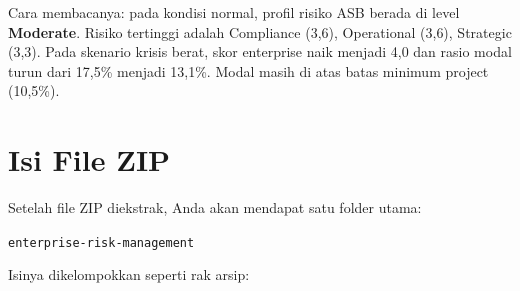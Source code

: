 \documentclass[11pt,a4paper]{article}
\newcommand{\file}[1]{\texttt{\small #1}}
\begin{document}
Cara membacanya: pada kondisi normal, profil risiko ASB berada di level \textbf{Moderate}. Risiko tertinggi adalah Compliance (3{,}6), Operational (3{,}6), Strategic (3{,}3). Pada skenario krisis berat, skor enterprise naik menjadi 4{,}0 dan rasio modal turun dari 17{,}5\% menjadi 13{,}1\%. Modal masih di atas batas minimum project (10{,}5\%).

\section{Isi File ZIP}\label{sec:zip}

Setelah file ZIP diekstrak, Anda akan mendapat satu folder utama:

\begin{center}\file{enterprise-risk-management}\end{center}

Isinya dikelompokkan seperti rak arsip:
\end{document}
